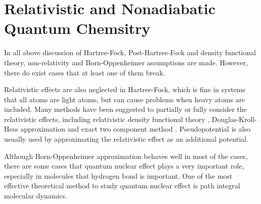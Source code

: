 \section{Relativistic and Nonadiabatic Quantum Chemsitry}
In all above discussion of Hartree-Fock, Post-Hartree-Fock and density functional theory, non-relativity and Born-Oppenheimer assumptions are made.
However, there do exist cases that at least one of them break.

Relativistic effects are also neglected in Hartree-Fock, which is fine in systems that all atoms are light atoms, but can cause problems when heavy atoms are included. \cite{relativ}
Many methods have been suggested to partially or fully consider the relativistic effects, including relativistic density functional theory \cite{reladft}, Douglas-Kroll-Hess approximation \cite{dkh} and exact two component method \cite{x2c}.
Pseudopotential is also usually used by approximating the relativistic effect as an additional potential. \cite{relaqchem}

Although Born-Oppenheimer approximation behaves well in most of the cases, there are some cases that quantum nuclear effect plays a very important role, especially in molecules that hydrogen bond is important. \cite{tomqne}
One of the most effective theoretical method to study quantum nuclear effect is path integral molecular dynamics. \cite{pimd}

